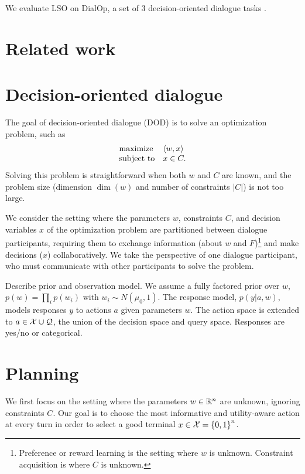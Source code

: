 \documentclass[11pt]{article}
\begin{document}
We evaluate LSO on DialOp, a set of 3 decision-oriented dialogue tasks \citep{lin2023decision}.

\section{Related work}

\section{Decision-oriented dialogue}
The goal of decision-oriented dialogue (DOD) is to solve an optimization problem, such as
\begin{equation}
\label{eqn:obj}
\begin{array}{ll}
\mbox{maximize} & \left\langle w,x\right\rangle\\
\mbox{subject to} & x \in C.
\end{array}
\end{equation}
Solving this problem is straightforward when both $w$ and $C$ are known,
and the problem size (dimension $\dim(w)$ and number of constraints $|C|$) is not too large.

We consider the setting where the parameters $w$, constraints $C$, and decision variables $x$ of the optimization problem are partitioned between dialogue participants, requiring them to exchange information (about $w$ and $F$)\footnote{Preference or reward learning is the setting where $w$ is unknown. Constraint acquisition is where $C$ is unknown.} and make decisions  ($x$) collaboratively.
We take the perspective of one dialogue participant, who must communicate with other participants to solve the problem.

Describe prior and observation model.
We assume a fully factored prior over $w$, $p(w) = \prod_i p(w_i)$ with $w_i\sim N(\mu_0,1)$.
The response model, $p(y | a,w)$, models responses $y$ to actions $a$ given parameters $w$.
The action space is extended to $a \in \mathcal{X} \cup \mathcal{Q}$, the union of the decision space and query space.
Responses are yes/no or categorical.

\section{Planning}
We first focus on the setting where the parameters $w\in\mathbb{R}^n$ are unknown, ignoring constraints $C$.
Our goal is to choose the most informative and utility-aware action at every turn in order to select a good terminal $x\in\mathcal{X} = \left\{0,1\right\}^n$.
\end{document}
